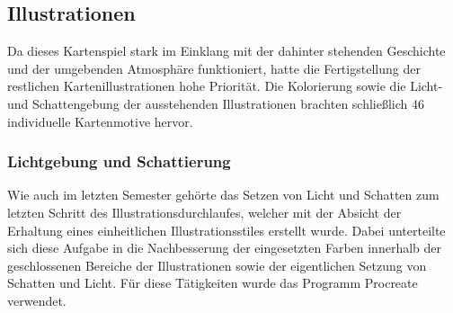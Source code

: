 \subsection{Illustrationen}
Da dieses Kartenspiel stark im Einklang mit der dahinter stehenden Geschichte und der umgebenden Atmosphäre funktioniert, hatte die Fertigstellung der restlichen Kartenillustrationen hohe Priorität. Die Kolorierung sowie die Licht- und Schattengebung der ausstehenden Illustrationen brachten schließlich 46 individuelle Kartenmotive hervor.

\subsubsection{Lichtgebung und Schattierung}
Wie auch im letzten Semester gehörte das Setzen von Licht und Schatten zum letzten Schritt des Illustrationsdurchlaufes, welcher mit der Absicht der Erhaltung eines einheitlichen Illustrationsstiles erstellt wurde. Dabei unterteilte sich diese Aufgabe in die Nachbesserung der eingesetzten Farben innerhalb der geschlossenen Bereiche der Illustrationen sowie der eigentlichen Setzung von Schatten und Licht. Für diese Tätigkeiten wurde das Programm Procreate verwendet.